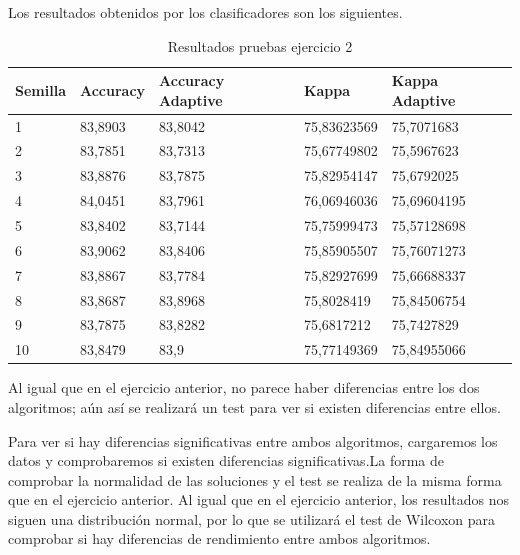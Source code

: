 Los resultados obtenidos por los clasificadores son los siguientes.
\begin{table}[H]
	\begin{tabular}{lllll}
		\textbf{Semilla} & \textbf{Accuracy} & \textbf{Accuracy Adaptive} & \textbf{Kappa} & \textbf{Kappa Adaptive} \\ \hline
		1                & 83,8903           & 83,8042                    & 75,83623569    & 75,7071683              \\
		2                & 83,7851           & 83,7313                    & 75,67749802    & 75,5967623              \\
		3                & 83,8876           & 83,7875                    & 75,82954147    & 75,6792025              \\
		4                & 84,0451           & 83,7961                    & 76,06946036    & 75,69604195             \\
		5                & 83,8402           & 83,7144                    & 75,75999473    & 75,57128698             \\
		6                & 83,9062           & 83,8406                    & 75,85905507    & 75,76071273             \\
		7                & 83,8867           & 83,7784                    & 75,82927699    & 75,66688337             \\
		8                & 83,8687           & 83,8968                    & 75,8028419     & 75,84506754             \\
		9                & 83,7875           & 83,8282                    & 75,6817212     & 75,7427829              \\
		10               & 83,8479           & 83,9                       & 75,77149369    & 75,84955066            
	\end{tabular}
\label{table:2}
\caption{Resultados pruebas ejercicio 2}
\end{table}

Al igual que en el ejercicio anterior, no parece haber diferencias entre los dos algoritmos; aún así se realizará un test para ver si existen diferencias entre ellos.


Para ver si hay diferencias significativas entre ambos algoritmos, cargaremos los datos y comprobaremos si existen diferencias significativas.La forma de comprobar la normalidad de las soluciones y el test se realiza de la misma forma que en el ejercicio anterior. Al igual que en el ejercicio anterior, los resultados nos siguen una distribución normal, por lo que se utilizará el test de Wilcoxon para comprobar si hay diferencias de rendimiento entre ambos algoritmos.

